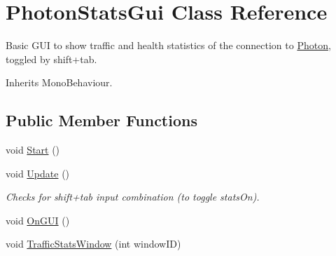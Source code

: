 \hypertarget{class_photon_stats_gui}{}\section{Photon\+Stats\+Gui Class Reference}
\label{class_photon_stats_gui}


Basic G\+UI to show traffic and health statistics of the connection to \hyperlink{namespace_photon}{Photon}, toggled by shift+tab.  




Inherits Mono\+Behaviour.

\subsection*{Public Member Functions}
\begin{DoxyCompactItemize}
\item 
void \hyperlink{class_photon_stats_gui_ae7fb408f7fb6e9525337271d2363ae33}{Start} ()
\item 
void \hyperlink{class_photon_stats_gui_a222bbb9f4b1c640489101a5f3bcada8a}{Update} ()
\begin{DoxyCompactList}\small\item\em Checks for shift+tab input combination (to toggle stats\+On).\end{DoxyCompactList}\item 
void \hyperlink{class_photon_stats_gui_a8aa98b7db81d540b6e9c42f37d3a927b}{On\+G\+UI} ()
\item 
void \hyperlink{class_photon_stats_gui_a58101a043bbe7de9d53f14ac111646b2}{Traffic\+Stats\+Window} (int window\+ID)
\end{DoxyCompactItemize}

